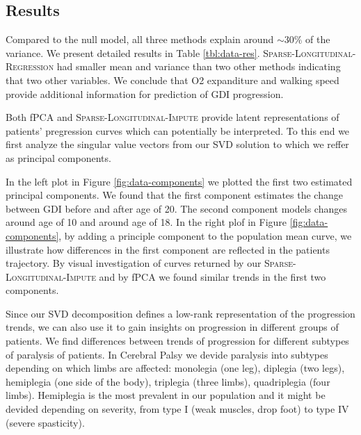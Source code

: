 \documentclass[preprint]{imsart}
\numberwithin{equation}{section}
\theoremstyle{plain}
\begin{document}
\subsection{Results}\label{ss:results}

Compared to the null model, all three methods explain around $\sim 30\%$ of the variance. We present detailed results in Table \ref{tbl:data-res}. \textsc{Sparse-Longitudinal-Regression} had smaller mean and variance than two other methods indicating that two other variables. We conclude that O2 expanditure and walking speed provide additional information for prediction of GDI progression.

Both fPCA and \textsc{Sparse-Longitudinal-Impute} provide latent representations of patients' pregression curves which can potentially be interpreted. To this end we first analyze the singular value vectors from our SVD solution to which we reffer as principal components.

In the left plot in Figure \ref{fig:data-components} we plotted the first two estimated principal components. We found that the first component estimates the change between GDI before and after age of 20. The second component models changes around age of 10 and around age of 18. In the right plof in Figure \ref{fig:data-components}, by adding a principle component to the population mean curve, we illustrate how differences in the first component are reflected in the patients trajectory. By visual investigation of curves returned by our \textsc{Sparse-Longitudinal-Impute} and by fPCA we found similar trends in the first two components.

Since our SVD decomposition defines a low-rank representation of the progression trends, we can also use it to gain insights on progression in different groups of patients. We find differences between trends of progression for different subtypes of paralysis of patients. In Cerebral Palsy we devide paralysis into subtypes depending on which limbs are affected: monolegia (one leg), diplegia (two legs), hemiplegia (one side of the body), triplegia (three limbs), quadriplegia (four limbs). Hemiplegia is the most prevalent in our population and it might be devided depending on severity, from type I (weak muscles, drop foot) to type IV (severe spasticity).
\end{document}

